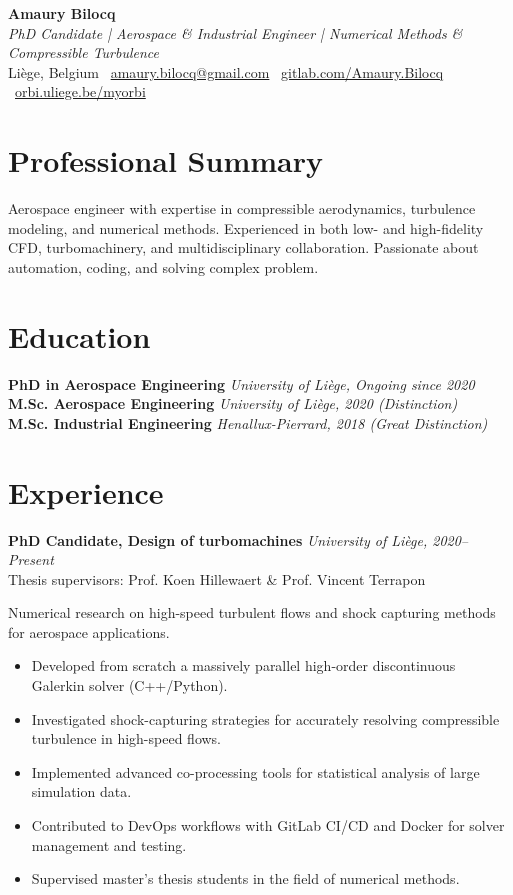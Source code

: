 \documentclass[a4paper,10pt]{article}
\begin{document}
\begin{center}
    {\LARGE \textbf{Amaury Bilocq}}\\
    \textit{PhD Candidate | Aerospace \& Industrial Engineer | Numerical Methods \& Compressible Turbulence}\\
    Liège, Belgium \quad \faEnvelope\ \href{mailto:amaury.bilocq@gmail.com}{amaury.bilocq@gmail.com} \quad
    \faGithub\ \href{https://gitlab.uliege.be}{gitlab.com/Amaury.Bilocq} \quad
    \faGlobe\ \href{https://orbi.uliege.be/profile?uid=p216754}{orbi.uliege.be/myorbi}
\end{center}

\section*{Professional Summary}
Aerospace engineer with expertise in compressible aerodynamics, turbulence modeling, and numerical methods. Experienced in both low- and high-fidelity CFD, turbomachinery, and multidisciplinary collaboration. Passionate about automation, coding, and solving complex problem.

\section*{Education}
\textbf{PhD in Aerospace Engineering} \hfill \textit{University of Liège, Ongoing since 2020}\\
\textbf{M.Sc. Aerospace Engineering} \hfill \textit{University of Liège, 2020 (Distinction)}\\
\textbf{M.Sc. Industrial Engineering} \hfill \textit{Henallux-Pierrard, 2018 (Great Distinction)}

\section*{Experience}
\textbf{PhD Candidate, Design of turbomachines} \hfill \textit{University of Liège, 2020–Present} \\
Thesis supervisors: Prof. Koen Hillewaert \& Prof. Vincent Terrapon

Numerical research on high-speed turbulent flows and shock capturing methods for aerospace applications.
\begin{itemize}[leftmargin=1.5em]
  \item Developed from scratch a massively parallel high-order discontinuous Galerkin solver (C++/Python).
  \item Investigated shock-capturing strategies for accurately resolving compressible turbulence in high-speed flows.
  \item Implemented advanced co-processing tools for statistical analysis of large simulation data.
  \item Contributed to DevOps workflows with GitLab CI/CD and Docker for solver management and testing.
  \item Supervised master's thesis students in the field of numerical methods.
\end{itemize}
\end{document}
